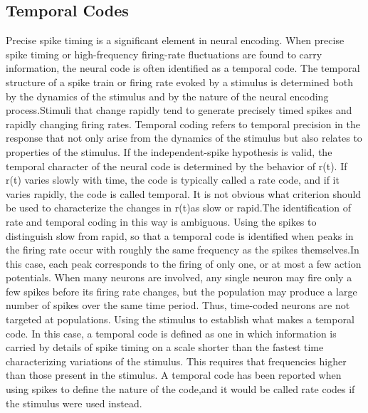 \documentclass[letterpaper,oneside]{book}
\numberwithin{equation}{chapter}
\theoremstyle{definition}
\begin{document}
\begin{multicols}{2}
\subsection{Temporal Codes}
\ntn Precise spike timing is a significant element in neural encoding. When precise spike timing or high-frequency firing-rate fluctuations are found to carry information, the neural code is often identified as a temporal code.
\rem The temporal structure of a spike train or firing rate evoked by a stimulus is determined both by the dynamics of the stimulus and by the nature of the neural encoding process.Stimuli that change rapidly tend to generate precisely timed spikes and rapidly changing firing rates.
\ntn Temporal coding refers to temporal precision in the response that not only arise from the dynamics of the stimulus but also relates to properties of the stimulus.
\rem If the independent-spike hypothesis is valid, the temporal character of the neural code is determined by the behavior of r(t).
 If r(t) varies slowly with time, the code is typically called a rate code, and if it varies rapidly, the code is called temporal.
\rem It is not obvious what criterion should be used to characterize the changes in r(t)as slow or rapid.The identification of rate and temporal coding in this way is ambiguous.
 Using the spikes to distinguish slow from rapid, so that a temporal code is identified when peaks in the firing rate occur with roughly the same frequency as the spikes themselves.In this case, each peak corresponds to the firing of only one, or at most a few action potentials.
\coro When many neurons are involved, any single neuron may fire only a few spikes before its firing rate changes, but the population may produce a large number of spikes over the same time period. Thus, time-coded neurons are not targeted at populations.
 Using the stimulus to establish what makes a temporal code. In this case, a temporal code is defined as one in which information is carried by details of spike timing on a scale shorter than the fastest time characterizing variations of the stimulus.
\coro This requires that frequencies higher than those present in the stimulus.
\ntn A temporal code has been reported when using spikes to define the nature of the code,and it would be called rate codes if the stimulus
were used instead.

%


%

%


\end{multicols}
\end{document}
